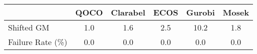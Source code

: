 \begin{tabular}{lccccc}
  \hline
   & \textbf{QOCO} & \textbf{Clarabel} & \textbf{ECOS} & \textbf{Gurobi} & \textbf{Mosek} \\ \hline
  Shifted GM & 1.0 & 1.6 & 2.5 & 10.2 & 1.8 \\ 
  Failure Rate (\%) & 0.0 & 0.0 & 0.0 & 0.0 & 0.0 \\ \hline 
\end{tabular}
